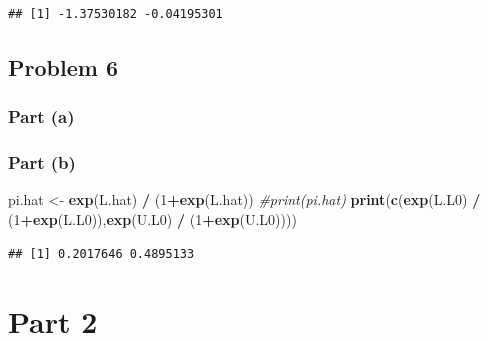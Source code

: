 \documentclass[
  11pt,
]{article}
\newenvironment{Shaded}{\begin{snugshade}}{\end{snugshade}}
\newcommand{\CommentTok}[1]{\textcolor[rgb]{0.56,0.35,0.01}{\textit{#1}}}
\newcommand{\DecValTok}[1]{\textcolor[rgb]{0.00,0.00,0.81}{#1}}
\newcommand{\FunctionTok}[1]{\textcolor[rgb]{0.13,0.29,0.53}{\textbf{#1}}}
\newcommand{\NormalTok}[1]{#1}
\newcommand{\OtherTok}[1]{\textcolor[rgb]{0.56,0.35,0.01}{#1}}
\newcommand{\SpecialCharTok}[1]{\textcolor[rgb]{0.81,0.36,0.00}{\textbf{#1}}}
\begin{document}
\begin{verbatim}
## [1] -1.37530182 -0.04195301
\end{verbatim}

\hypertarget{problem-6}{%
\subsection{Problem 6}\label{problem-6}}

\hypertarget{part-a-4}{%
\subsubsection{Part (a)}\label{part-a-4}}


\hypertarget{part-b-4}{%
\subsubsection{Part (b)}\label{part-b-4}}


\begin{Shaded}
\begin{Highlighting}[]
\NormalTok{pi.hat }\OtherTok{\textless{}{-}} \FunctionTok{exp}\NormalTok{(L.hat) }\SpecialCharTok{/}\NormalTok{ (}\DecValTok{1}\SpecialCharTok{+}\FunctionTok{exp}\NormalTok{(L.hat))}
\CommentTok{\#print(pi.hat)}
\FunctionTok{print}\NormalTok{(}\FunctionTok{c}\NormalTok{(}\FunctionTok{exp}\NormalTok{(L.L0) }\SpecialCharTok{/}\NormalTok{ (}\DecValTok{1}\SpecialCharTok{+}\FunctionTok{exp}\NormalTok{(L.L0)),}\FunctionTok{exp}\NormalTok{(U.L0) }\SpecialCharTok{/}\NormalTok{ (}\DecValTok{1}\SpecialCharTok{+}\FunctionTok{exp}\NormalTok{(U.L0))))}
\end{Highlighting}
\end{Shaded}

\begin{verbatim}
## [1] 0.2017646 0.4895133
\end{verbatim}

\hypertarget{part-2}{%
\section{Part 2}\label{part-2}}
\end{document}

